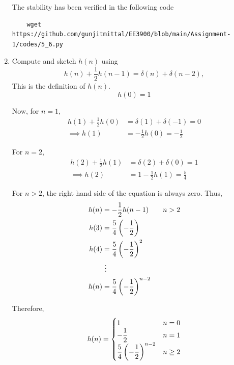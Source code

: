 \documentclass[journal,12pt,twocolumn]{IEEEtran}
\renewcommand\thesection{\arabic{section}}
\begin{document}
\begin{enumerate}[label=\thesection.\arabic*]
	\solution The stability has been verified in the following code
  \begin{lstlisting}
    wget https://github.com/gunjitmittal/EE3900/blob/main/Assignment-1/codes/5_6.py
    \end{lstlisting}
\item 
Compute and sketch $h(n)$ using 
\begin{equation}
\label{eq:iir_filter_h}
h(n) + \frac{1}{2}h(n-1) = \delta(n) + \delta(n-2), 
\end{equation}
%
This is the definition of $h(n)$.
\\
\solution 
	\begin{equation}
		h(0) = 1
	\end{equation}
	
	Now, for $n = 1$,
	\begin{align}
		h(1) + \frac12 h(0) &= \delta(1) + \delta(-1) = 0 \\
		\implies h(1) &= - \frac{1}{2} h(0) = -\frac{1}{2}
	\end{align}
	
	For $n = 2$,
	\begin{align}
		h(2) + \frac12 h(1) &= \delta(2) + \delta(0) = 1 \\
		\implies h(2) &= 1 - \frac{1}{2} h(1) = \frac{5}{4}
	\end{align}
	
	For $n > 2$, the right hand side of the equation is always zero. Thus,
	\begin{align}
		h(n) &= -\frac{1}{2} h(n-1) \qquad n > 2 \\
		h(3) &= \frac{5}{4} \left(-\frac12\right) \\
		h(4) &= \frac{5}{4} \left(-\frac12\right)^2 \\
		&~\vdots \\
		h(n) &= \frac{5}{4} \left(-\frac12\right)^{n-2}
	\end{align}
	
	Therefore,
	\begin{align}
		h(n) = 
		\begin{cases}
			1 & n = 0 \\
			-\dfrac{1}{2} & n = 1 \\
			\dfrac{5}{4} \left(-\dfrac12\right)^{n-2} & n \ge 2
		\end{cases}
	\end{align}
	

\end{enumerate}
\end{document}
